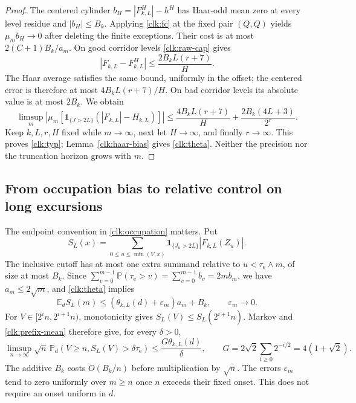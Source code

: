 \documentclass[11pt]{amsart}
\theoremstyle{definition}
\theoremstyle{remark}
\newcommand{\E}{\mathbb E}
\newcommand{\PP}{\mathbb P}
\newcommand{\one}{\mathbf 1}
\begin{document}
\begin{proof}
The centered cylinder $b_H=|F^H_{k,L}|-h^H$ has Haar-odd mean zero
at every level residue and $|b_H|\le B_k$. Applying \eqref{clk:fc} at
the fixed pair $(Q,Q)$ yields $\mu_m b_H\to0$ after deleting
the finite exceptions. Their cost is at most $2(C+1)B_k/a_m$.
On good corridor levels \eqref{clk:raw-cap} gives
\[
 |F_{k,L}-F^H_{k,L}|\le\frac{2B_kL(r+7)}H.
\]
The Haar average satisfies the same bound, uniformly in the offset;
the centered error is therefore at most $4B_k L(r+7)/H$. On bad
corridor levels its absolute value is at most $2B_k$. We obtain
\[
 \limsup_m\left|\mu_m[\one_{\{J>2L\}}(|F_{k,L}|-H_{k,L})]\right|
 \le\frac{4B_k L(r+7)}H+\frac{2B_k(4L+3)}{2^r}.
\]
Keep $k,L,r,H$ fixed while $m\to\infty$, next let $H\to\infty$,
and finally $r\to\infty$. This proves \eqref{clk:typ};
Lemma~\ref{clk:haar-bias} gives \eqref{clk:theta}. Neither the
precision nor the truncation horizon grows with $m$.
\end{proof}

\subsection{From occupation bias to relative control on long excursions}

The endpoint convention in \eqref{clk:occupation} matters. Put
\[
 S_L(x)=\sum_{0\le u\le\min(V,x)}
            \one_{\{J_u>2L\}}|F_{k,L}(Z_u)|.
\]
The inclusive cutoff has at most one extra summand relative to
$u<\tau_{\mathrm e}\wedge m$, of size at most $B_k$. Since
$\sum_{v=0}^{m-1}\PP(\tau_{\mathrm e}>v)=\sum_{v=0}^{m-1}b_v=2mb_m$, we have
$a_m\le2\sqrt m$, and \eqref{clk:theta} implies
\begin{equation}\label{clk:prefix-mean}
 \E_d S_L(m)\le(\theta_{k,L}(d)+\varepsilon_m)a_m+B_k,
 \qquad\varepsilon_m\longrightarrow0.
\end{equation}
For $V\in[2^in,2^{i+1}n)$, monotonicity gives
$S_L(V)\le S_L(2^{i+1}n)$. Markov and \eqref{clk:prefix-mean}
therefore give, for every $\delta>0$,
\begin{equation}\label{clk:dyadic-bias}
 \limsup_{n\to\infty}\sqrt n\,
 \PP_d(V\ge n,S_L(V)>\delta \tau_{\mathrm e})
 \le\frac{G\theta_{k,L}(d)}\delta,
 \qquad G=2\sqrt2\sum_{i\ge0}2^{-i/2}=4(1+\sqrt2).
\end{equation}
The additive $B_k$ costs $O(B_k/n)$ before multiplication by $\sqrt n$.
The errors $\varepsilon_m$ tend to zero uniformly over $m\ge n$
once $n$ exceeds their fixed onset. This does not require an onset
uniform in $d$.
\end{document}
